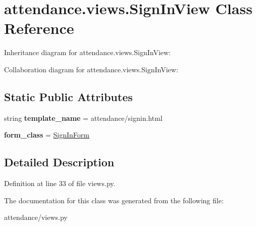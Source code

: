 \hypertarget{classattendance_1_1views_1_1_sign_in_view}{}\section{attendance.\+views.\+Sign\+In\+View Class Reference}
\label{classattendance_1_1views_1_1_sign_in_view}


Inheritance diagram for attendance.\+views.\+Sign\+In\+View\+:


Collaboration diagram for attendance.\+views.\+Sign\+In\+View\+:
\subsection*{Static Public Attributes}
\begin{DoxyCompactItemize}
\item 
\hypertarget{classattendance_1_1views_1_1_sign_in_view_a86731e73178c0572f1eb4553e3b87a74}{}\label{classattendance_1_1views_1_1_sign_in_view_a86731e73178c0572f1eb4553e3b87a74} 
string {\bfseries template\+\_\+name} = \textquotesingle{}attendance/signin.\+html\textquotesingle{}
\item 
\hypertarget{classattendance_1_1views_1_1_sign_in_view_ad53776846a70450cf7ca324d95085928}{}\label{classattendance_1_1views_1_1_sign_in_view_ad53776846a70450cf7ca324d95085928} 
{\bfseries form\+\_\+class} = \hyperlink{classattendance_1_1forms_1_1_sign_in_form}{Sign\+In\+Form}
\end{DoxyCompactItemize}


\subsection{Detailed Description}


Definition at line 33 of file views.\+py.



The documentation for this class was generated from the following file\+:\begin{DoxyCompactItemize}
\item 
attendance/views.\+py\end{DoxyCompactItemize}
